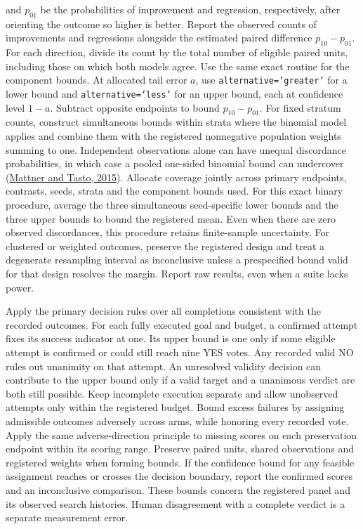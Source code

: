 \documentclass[11pt]{article}
\begin{document}
and $p_{01}$ be the probabilities of improvement and regression, respectively, after orienting the outcome so higher is better. Report the observed counts of improvements and regressions alongside the estimated paired difference $p_{10}-p_{01}$. For each direction, divide its count by the total number of eligible paired units, including those on which both models agree. Use the same exact routine for the component bounds. At allocated tail error $a$, use \texttt{alternative='greater'} for a lower bound and \texttt{alternative='less'} for an upper bound, each at confidence level $1-a$. Subtract opposite endpoints to bound $p_{10}-p_{01}$. For fixed stratum counts, construct simultaneous bounds within strata where the binomial model applies and combine them with the registered nonnegative population weights summing to one. Independent observations alone can have unequal discordance probabilities, in which case a pooled one-sided binomial bound can undercover (\href{https://www.math.uni.wroc.pl/~pms/files/35.2/Article/35.2.8.pdf}{Mattner and Tasto, 2015}). Allocate coverage jointly across primary endpoints, contrasts, seeds, strata and the component bounds used. For this exact binary procedure, average the three simultaneous seed-specific lower bounds and the three upper bounds to bound the registered mean. Even when there are zero observed discordances, this procedure retains finite-sample uncertainty. For clustered or weighted outcomes, preserve the registered design and treat a degenerate resampling interval as inconclusive unless a prespecified bound valid for that design resolves the margin. Report raw results, even when a suite lacks power.

Apply the primary decision rules over all completions consistent with the recorded outcomes. For each fully executed goal and budget, a confirmed attempt fixes its success indicator at one. Its upper bound is one only if some eligible attempt is confirmed or could still reach nine YES votes. Any recorded valid NO rules out unanimity on that attempt. An unresolved validity decision can contribute to the upper bound only if a valid target and a unanimous verdict are both still possible. Keep incomplete execution separate and allow unobserved attempts only within the registered budget. Bound excess failures by assigning admissible outcomes adversely across arms, while honoring every recorded vote. Apply the same adverse-direction principle to missing scores on each preservation endpoint within its scoring range. Preserve paired units, shared observations and registered weights when forming bounds. If the confidence bound for any feasible assignment reaches or crosses the decision boundary, report the confirmed scores and an inconclusive comparison. These bounds concern the registered panel and its observed search histories. Human disagreement with a complete verdict is a separate measurement error.
\end{document}
